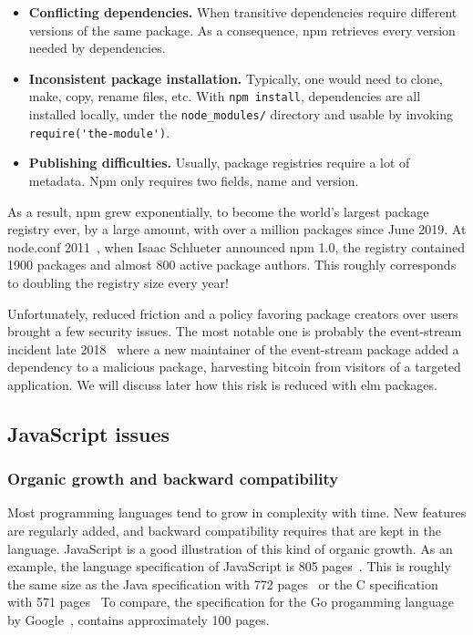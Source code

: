 \begin{itemize}
	\item \textbf{Conflicting dependencies.}
		When transitive dependencies require different versions of the same package.
		As a consequence, npm retrieves every version needed by dependencies.
	\item \textbf{Inconsistent package installation.}
		Typically, one would need to clone, make, copy, rename files, etc.
		With \verb|npm install|, dependencies are all installed locally,
		under the \verb|node_modules/| directory and usable by invoking
		\verb|require('the-module')|.
	\item \textbf{Publishing difficulties.}
		Usually, package registries require a lot of metadata.
		Npm only requires two fields, name and version.
\end{itemize}


As a result, npm grew exponentially, to become the world's largest package
registry ever, by a large amount, with over a million packages since June 2019.
At node.conf 2011~\cite{npm-video}, when Isaac Schlueter announced npm 1.0,
the registry contained 1900 packages and almost 800 active package authors.
This roughly corresponds to doubling the registry size every year!

Unfortunately, reduced friction and a policy favoring package creators over users
brought a few security issues.
The most notable one is probably the event-stream incident late 2018~\cite{npm-event-stream}
where a new maintainer of the event-stream package added a dependency
to a malicious package, harvesting bitcoin from visitors of a targeted application.
We will discuss later how this risk is reduced with elm packages.


\subsection{JavaScript issues}%
\label{sub:javascript_issues}

\subsubsection{Organic growth and backward compatibility}%
\label{ssub:organic_growth_and_backward_compatibility}

Most programming languages tend to grow in complexity with time.
New features are regularly added, and backward compatibility requires that
 are kept in the language.
JavaScript is a good illustration of this kind of organic growth.
As an example, the language specification of JavaScript is 805 pages~\cite{ecmascript-pdf}.
This is roughly the same size as the Java specification with 772 pages~\cite{java-spec-pdf}
or the C specification with 571 pages~\cite{c-spec-pdf}
To compare, the specification for the Go progamming language
by Google~\cite{go-spec}, contains approximately 100 pages.

